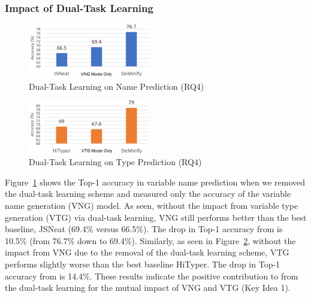 \subsubsection{Impact of Dual-Task Learning}
\label{sec:dual-task-result}


\begin{figure}[t]%
\begin{center}
\includegraphics[width=2.1in]{figures/dual-task-result-111}
\vspace{-8pt}
\caption{Dual-Task Learning on Name Prediction (RQ4)}
\label{dual-task-result-1}
\end{center}
\end{figure}

\begin{figure}[t]%
\begin{center}
\includegraphics[width=2.1in]{figures/dual-task-result-222}
\vspace{-8pt}
\caption{Dual-Task Learning on Type Prediction (RQ4)}
\label{dual-task-result-2}
\end{center}
\end{figure}

Figure~\ref{dual-task-result-1} shows the Top-1 accuracy in variable
name prediction when we removed the dual-task learning scheme and
measured only the accuracy of the variable name generation (VNG)
model.  As seen, without the impact from variable type generation
(VTG) via dual-task learning, VNG still performs better than the best
baseline, JSNeat (69.4\% versus 66.5\%). The drop in Top-1 accuracy
from {\tool} is 10.5\% (from 76.7\% down to 69.4\%). Similarly, as seen
in Figure~\ref{dual-task-result-2}, without the impact from VNG due to
the removal of the dual-task learning scheme, VTG performs slightly
worse than the best baseline HiTyper. The drop in Top-1 accuracy from
{\tool} is 14.4\%.  These results indicate the positive contribution
to {\tool} from the dual-task learning for the mutual impact of VNG
and VTG (Key Idea 1).
